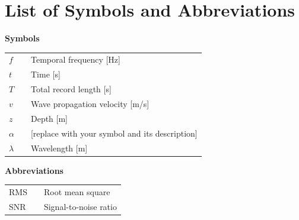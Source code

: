 %

\chapter*{List of Symbols and Abbreviations}
\thispagestyle{plain}

\renewcommand{\arraystretch}{1.0}

\noindent\textbf{Symbols}
\begin{longtable}{@{}p{2.8cm} p{0.5cm} p{10cm}@{}}
$f$               && Temporal frequency [Hz] \\
$t$               && Time [s] \\
$T$               && Total record length [s] \\
$v$               && Wave propagation velocity [m/s] \\
$z$               && Depth [m] \\
$\alpha$          && [replace with your symbol and its description] \\
$\lambda$         && Wavelength [m] \\
\end{longtable}

\vspace{0.3cm}

\noindent\textbf{Abbreviations}
\begin{longtable}{@{}p{2.8cm} p{0.5cm} p{10cm}@{}}
RMS    && Root mean square \\
SNR    && Signal-to-noise ratio \\
\end{longtable}
